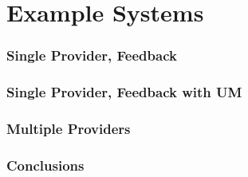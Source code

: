 \documentclass[t, 10pt]{beamer}
\begin{document}
\section{Example Systems}
\begin{frame}
\frametitle{Single Provider, Feedback}

\end{frame}

\begin{frame}
\frametitle{Single Provider, Feedback with UM}


\end{frame}

\begin{frame}
\frametitle{Multiple Providers}

\end{frame}

\begin{frame}
\frametitle{Conclusions}

\end{frame}

%
%
\end{document}
